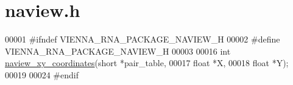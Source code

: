 \hypertarget{naview_8h_source}{}\section{naview.\+h}
\label{naview_8h_source}

\begin{DoxyCode}
00001 \textcolor{preprocessor}{#ifndef VIENNA\_RNA\_PACKAGE\_NAVIEW\_H}
00002 \textcolor{preprocessor}{#define VIENNA\_RNA\_PACKAGE\_NAVIEW\_H}
00003 
00016 \textcolor{keywordtype}{int} \mbox{\hyperlink{group__plotting__utils_ga948111b910926f0405a3fa920c790816}{naview\_xy\_coordinates}}(\textcolor{keywordtype}{short} *pair\_table,
00017                           \textcolor{keywordtype}{float} *X,
00018                           \textcolor{keywordtype}{float} *Y);
00019 
00024 \textcolor{preprocessor}{#endif}
\end{DoxyCode}
